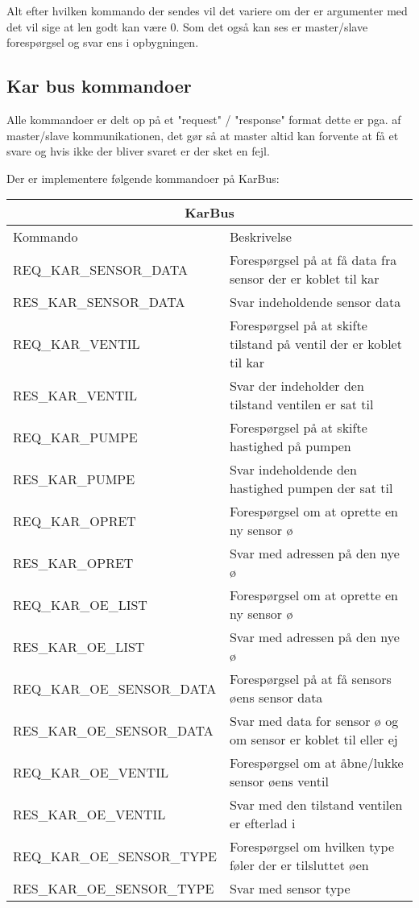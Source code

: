 Alt efter hvilken kommando der sendes vil det variere om der er argumenter med det vil sige at len godt kan være 0. Som det også kan ses er master/slave forespørgsel og svar ens i opbygningen.

\subsection{Kar bus kommandoer}
Alle kommandoer er delt op på et "request" / "response" format dette er pga. af master/slave kommunikationen, det gør så at master altid kan forvente at få et svare og hvis ikke der bliver svaret er der sket en fejl.

Der er implementere følgende kommandoer på KarBus:

\begin{table}[H]
\setlength{\parindent}{12pt}
\begin{tabular}{|l|l|}\hline
\multicolumn{2}{|c|}{KarBus\cellcolor[gray]{0.7}}\\\hline
Kommando & Beskrivelse \\\hline
REQ\_KAR\_SENSOR\_DATA 		& Forespørgsel på at få data fra sensor der er koblet til kar \\\hline 
RES\_KAR\_SENSOR\_DATA 		& Svar indeholdende sensor data								 \\\hline 
REQ\_KAR\_VENTIL	   		& Forespørgsel på at skifte tilstand på ventil der er koblet til kar \\\hline 
RES\_KAR\_VENTIL       		& Svar der indeholder den tilstand ventilen er sat til \\\hline 
REQ\_KAR\_PUMPE		   		& Forespørgsel på at skifte hastighed på pumpen \\\hline 
RES\_KAR\_PUMPE 	   		& Svar indeholdende den hastighed pumpen der sat til \\\hline 
REQ\_KAR\_OPRET 	   		& Forespørgsel om at oprette en ny sensor ø \\\hline
RES\_KAR\_OPRET 	   		& Svar med adressen på den nye ø \\\hline 
REQ\_KAR\_OE\_LIST	   		& Forespørgsel om at oprette en ny sensor ø \\\hline
RES\_KAR\_OE\_LIST	   		& Svar med adressen på den nye ø \\\hline 
REQ\_KAR\_OE\_SENSOR\_DATA	& Forespørgsel på at få sensors øens sensor data \\\hline
RES\_KAR\_OE\_SENSOR\_DATA 	& Svar med data for sensor ø og om sensor er koblet til eller ej \\\hline 
REQ\_KAR\_OE\_VENTIL 	    & Forespørgsel om at åbne/lukke sensor øens ventil \\\hline
RES\_KAR\_OE\_VENTIL 	    & Svar med den tilstand ventilen er efterlad i \\\hline
REQ\_KAR\_OE\_SENSOR\_TYPE 	& Forespørgsel om hvilken type føler der er tilsluttet øen \\\hline
RES\_KAR\_OE\_SENSOR\_TYPE 	& Svar med sensor type \\\hline  
\end{tabular}
\end{table}

